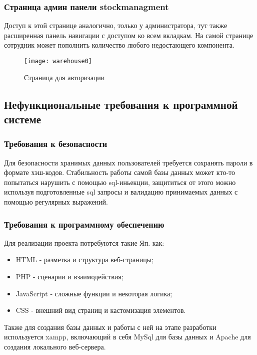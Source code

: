 \newpage

\subsubsection{Страница админ панели stockmanagment}

Доступ к этой странице аналогично, только у администратора, тут также расширенная панель навигации с доступом ко всем вкладкам. На самой странице сотрудник может пополнить количество любого недостающего компонента.

\begin{figure}[ht]
	\texttt{[image: warehouse0]}
	\caption{Страница для авторизации}
	\label{indext:warehouse0}
\end{figure}

\newpage

\subsection{Нефункциональные требования к программной системе}

\subsubsection{Требования к безопасности}
Для безопасности хранимых данных пользователей требуется сохранять пароли в формате  хэш-кодов. Стабильность работы самой базы данных может кто-то попытаться нарушить с помощью sql-иньекции, защититься от этого можно используя подготовленные sql запросы и валидацию принимаемых данных с помощью регулярных выражений.
\subsubsection{Требования к программному обеспечению}
Для реализации проекта потребуются такие Яп. как:
\begin{itemize}
	\item HTML - разметка и структура веб-страницы;
	\item PHP - сценарии и взаимодействия;
	\item JavaScript - сложные функции и некоторая логика;
	\item CSS - внешний вид страниц и кастомизация элементов.		
\end{itemize}

Также для создания базы данных и работы с ней на этапе разработки используется xampp, включающий в себя MySql для базы данных и Apache для создания локального веб-сервера. 


